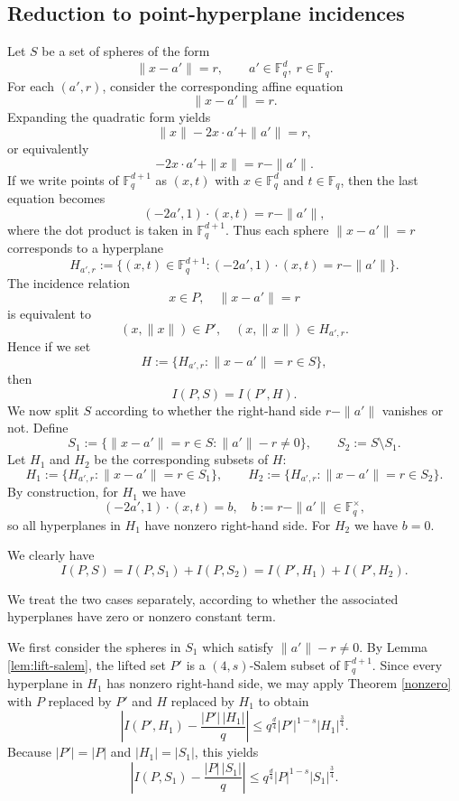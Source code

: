 \documentclass{article}
\def\steven#1{\noindent
\textcolor{red}
{\textsc{(Steven:}
\textsf{#1})}}
\begin{document}
\subsection*{Reduction to point-hyperplane incidences}
Let $S$ be a set of spheres of the form
\[
\|x - a'\| = r, \qquad a'\in \mathbb{F}_q^d,\ r \in \mathbb{F}_q.
\]
For each $(a',r)$, consider the corresponding affine equation
\[
\|x- a'\| = r.
\]
Expanding the quadratic form yields
\[
\|x\| - 2 x \cdot a' + \|a'\| = r,
\]
or equivalently
\[
-2 x\cdot a' + \|x\| = r - \|a'\|.
\]
If we write points of $\mathbb{F}_q^{d+1}$ as $(x,t)$ with $x \in \mathbb{F}_q^d$ and $t \in \mathbb{F}_q$, then the last equation becomes
\[
(-2a',1) \cdot (x,t) = r - \|a'\|,
\]
where the dot product is taken in $\mathbb{F}_q^{d+1}$. Thus each sphere $\|x-a'\|=r$ corresponds to a hyperplane
\[
H_{a',r} := \{(x,t) \in \mathbb{F}_q^{d+1} : (-2a',1) \cdot (x,t) = r - \|a'\|\}.
\]
The incidence relation
\[
x \in P,\quad \|x-a'\| = r
\]
is equivalent to
\[
(x,\|x\|) \in P',\quad (x,\|x\|) \in H_{a',r}.
\]
Hence if we set
\[
H := \{ H_{a',r} : \|x-a'\| = r \in S \},
\]
then
\[
I(P,S) = I(P',H).
\]
We now split $S$ according to whether the right-hand side $r - \|a'\|$ vanishes or not. Define
\[
S_1 := \{ \|x -a'\| = r \in S : \|a'\| - r \neq 0 \},
\qquad
S_2 := S \setminus S_1.
\]
Let $H_1$ and $H_2$ be the corresponding subsets of $H$:
\[
H_1 := \{H_{a',r} : \|x -a'\| = r \in S_1\},
\qquad
H_2 := \{H_{a',r} : \|x -a'\|= r \in S_2\}.
\]
By construction, for $H_1$ we have
\[
(-2a',1) \cdot (x,t) = b, \quad b := r - \|a'\| \in \mathbb{F}_q^\times,
\]
so all hyperplanes in $H_1$ have nonzero right-hand side. For $H_2$ we have $b = 0$.

We clearly have
\[
I(P,S) = I(P,S_1) + I(P,S_2) = I(P',H_1) + I(P',H_2).
\]



We treat the two cases separately, according to whether the associated hyperplanes have zero or nonzero constant term.

We first consider the spheres in $S_1$ which satisfy $\|a'\|-r \neq 0$.
By Lemma \ref{lem:lift-salem}, the lifted set $P'$ is a $(4,s)$-Salem subset of $\mathbb{F}_q^{d+1}$. Since every hyperplane in $H_1$ has nonzero right-hand side, we may apply Theorem \ref{nonzero} with $P$ replaced by $P'$ and $H$ replaced by $H_1$ to obtain
\[
\left| I(P',H_1) - \frac{|P'| \, |H_1|}{q} \right|
\le q^{\frac{d}{4}} |P'|^{1-s}  |H_1|^{\frac{3}{4}}.
\]
Because $|P'|=|P|$ and $|H_1| = |S_1|$, this yields
\[
\left| I(P,S_1) - \frac{|P| \, |S_1|}{q} \right|
\le q^{\frac{d}{4}} |P|^{1-s}  |S_1|^{\frac{3}{4}}.
\]
\end{document}
